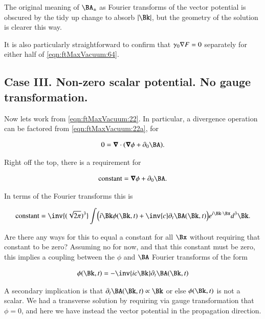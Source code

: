 The original meaning of $\BA_{\pm}$ as Fourier transforms of the vector potential is obscured by the tidy up change to absorb $\Abs{\Bk}$, but the geometry of the solution is clearer this way.

It is also particularly straightforward to confirm that $\gamma_0 \nabla F = 0$ separately for either half of \autoref{eqn:ftMaxVacuum:64}.

\subsection{Case III.  Non-zero scalar potential.  No gauge transformation.}

Now lets work from \autoref{eqn:ftMaxVacuum:22}.  In particular, a divergence operation can be factored from \autoref{eqn:ftMaxVacuum:22a}, for

\begin{align}\label{eqn:ftMaxVacuum:70}
0 = \spacegrad \cdot (\spacegrad \phi + \partial_0 \BA).
\end{align}

Right off the top, there is a requirement for 

\begin{align}\label{eqn:ftMaxVacuum:71}
\text{constant} = \spacegrad \phi + \partial_0 \BA.
\end{align}

In terms of the Fourier transforms this is

\begin{align}\label{eqn:ftMaxVacuum:72}
\text{constant} = 
\inv{(\sqrt{2 \pi})^3} \int 
\Bigl(
i \Bk \phi(\Bk, t) + \inv{c} \partial_t \BA(\Bk, t)
\Bigr)
e^{i \Bk \cdot \Bx } d^3 \Bk.
\end{align}

Are there any ways for this to equal a constant for all $\Bx$ without requiring that constant to be zero?  Assuming no for now, and that this constant must be zero, this implies a coupling between the $\phi$ and $\BA$ Fourier transforms of the form

\begin{align}
\label{eqn:ftMaxVacuum:73}
\phi(\Bk, t) = -\inv{i c \Bk} \partial_t \BA(\Bk, t)
\end{align}

A secondary implication is that $\partial_t \BA(\Bk, t) \propto \Bk$ or else $\phi(\Bk, t)$ is not a scalar.  We had a transverse solution by requiring via gauge transformation that $\phi = 0$, and here we have instead the vector potential in the propagation direction.

